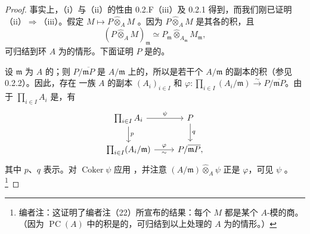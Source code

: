 \begin{proof}
事实上，（i）与（ii）的性由 0.2.F（iii）及 0.2.1 得到，而我们刚已证明（ii）$\Rightarrow$（iii）。假定 $M\mapsto P\widehat\otimes_A M$ 。因为 $P\widehat\otimes_A M$ 是其各的积，且
\[(P\widehat\otimes_A M)_{\mathfrak m}\simeq P_{\mathfrak m}\widehat\otimes_{A_{\mathfrak m}}M_{\mathfrak m},\]
可归结到环 $A$ 为的情形。下面证明 $P$ 是的。

设 $\mathfrak m$ 为 $A$ 的；则 $P/\overline{\mathfrak mP}$ 是 $A/\mathfrak m$ 上的，所以是若干个 $A/\mathfrak m$ 的副本的积（参见 0.2.2）。因此，存在
一族 $A$ 的副本 $(A_i)_{i\in I}$ 和 $\varphi:\prod_{i\in I}(A_i/\mathfrak m)\xrightarrow{\sim}P/\overline{\mathfrak mP}$。由于 $\prod_{i\in I}A_i$ 是，有
\[
\begin{tikzcd}
\prod_{i\in I}A_i\arrow[r,"\psi"]\arrow[d,"p"]&P\arrow[d,"q"]\\
\prod_{i\in I}(A_i/\mathfrak m)\arrow[r,"\varphi","\sim"']&P/\overline{\mathfrak mP},
\end{tikzcd}
\]
其中 $p$、$q$ 表示。对 $\operatorname{Coker}\psi$ 应用 ，并注意 $(A/\mathfrak m)\widehat\otimes_A\psi$ 正是 $\varphi$，可见 $\psi$ 。\footnote{编者注：这证明了编者注（22）所宣布的结果：每个 $M$ 都是某个 $A$-模的商。（因为 $\operatorname{PC}(A)$ 中的积是的，可归结到以上处理的 $A$ 为的情形。）}


\end{proof}
